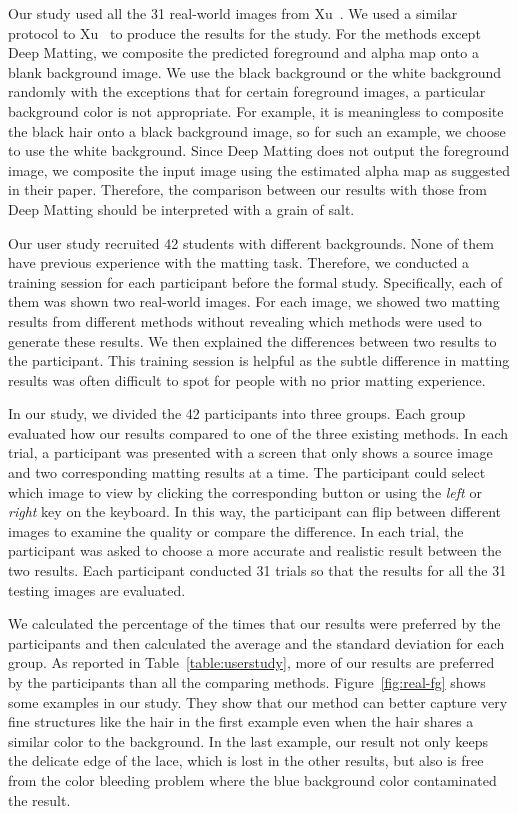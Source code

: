\documentclass[10pt,twocolumn,letterpaper]{article}
\begin{document}
Our study used all the 31 real-world images from Xu~\etal\cite{xu2017deep}. We used a similar protocol to Xu~\etal\cite{xu2017deep} to produce the results for the study. For the methods except Deep Matting, we composite the predicted foreground and alpha map onto a blank background image. We use the black background or the white background randomly with the exceptions that for certain foreground images, a particular background color is not appropriate. For example, it is meaningless to composite the black hair onto a black background image, so for such an example, we choose to use the white background. Since Deep Matting does not output the foreground image, we composite the input image using the estimated alpha map as suggested in their paper. Therefore, the comparison between our results with those from Deep Matting should be interpreted with a grain of salt. 

Our user study recruited 42 students with different backgrounds. None of them have previous experience with the matting task. Therefore, we conducted a training session for each participant before the formal study. Specifically, each of them was shown two real-world images. For each image, we showed two matting results from different methods without revealing which methods were used to generate these results. We then explained the differences between two results to the participant. This training session is helpful as the subtle difference in matting results was often difficult to spot for people with no prior matting experience.

In our study, we divided the 42 participants into three groups. Each group evaluated how our results compared to one of the three existing methods. In each trial, a participant was presented with a screen that only shows a source image and two corresponding matting results at a time. The participant could select which image to view by clicking the corresponding button or using the \emph{left} or \emph{right} key on the keyboard. In this way, the participant can flip between different images to examine the quality or compare the difference. In each trial, the participant was asked to choose a more accurate and realistic result between the two results. Each participant conducted 31 trials so that the results for all the 31 testing images are evaluated.

We calculated the percentage of the times that our results were preferred by the participants and then calculated the average and the standard deviation for each group. As reported in Table~\ref{table:userstudy}, more of our results are preferred by the participants than all the comparing methods. Figure~\ref{fig:real-fg} shows some examples in our study. They show that our method can better capture very fine structures like the hair in the first example even when the hair shares a similar color to the background. In the last example, our result not only keeps the delicate edge of the lace, which is lost in the other results, but also is free from the color bleeding problem where the blue background color contaminated the result. 
\end{document}
